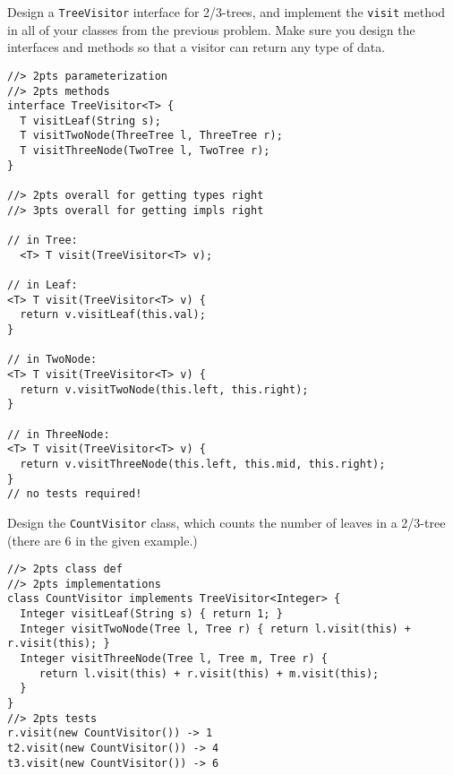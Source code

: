 \documentclass[12pt]{article}                   %
\def\pts#1{\marginpar{\footnotesize \raggedright  \fbox{#1 {\sc Points}}}}
\newenvironment{solution}{\color{red}}{}
\begin{document}
\begin{problem}\pts{22}

Design a \verb|TreeVisitor| interface for 2/3-trees, and implement the
\verb|visit| method in all of your classes from the previous problem.
Make sure you design the interfaces and methods so that a visitor can
return any type of data.

\begin{solution}
\begin{verbatim}
//> 2pts parameterization
//> 2pts methods
interface TreeVisitor<T> {
  T visitLeaf(String s);
  T visitTwoNode(ThreeTree l, ThreeTree r);
  T visitThreeNode(TwoTree l, TwoTree r);
}

//> 2pts overall for getting types right
//> 3pts overall for getting impls right

// in Tree:
  <T> T visit(TreeVisitor<T> v);

// in Leaf:
<T> T visit(TreeVisitor<T> v) { 
  return v.visitLeaf(this.val);
}

// in TwoNode:
<T> T visit(TreeVisitor<T> v) { 
  return v.visitTwoNode(this.left, this.right);
}

// in ThreeNode:
<T> T visit(TreeVisitor<T> v) { 
  return v.visitThreeNode(this.left, this.mid, this.right);
}
// no tests required!
\end{verbatim}
\end{solution}

\newpage

\ifrubric{}
\newpage
\fi


Design the \verb|CountVisitor| class, which counts the number of
leaves in a 2/3-tree (there are 6 in the given example.)

\begin{solution}
\begin{verbatim}
//> 2pts class def
//> 2pts implementations
class CountVisitor implements TreeVisitor<Integer> {
  Integer visitLeaf(String s) { return 1; }
  Integer visitTwoNode(Tree l, Tree r) { return l.visit(this) + r.visit(this); }
  Integer visitThreeNode(Tree l, Tree m, Tree r) { 
     return l.visit(this) + r.visit(this) + m.visit(this);
  }
}
//> 2pts tests
r.visit(new CountVisitor()) -> 1
t2.visit(new CountVisitor()) -> 4
t3.visit(new CountVisitor()) -> 6
\end{verbatim}
\end{solution}


\end{problem}
\end{document}
